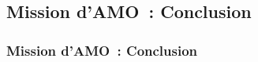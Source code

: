 \subsection{Mission d'AMO~: Conclusion}
\begin{frame}
	\frametitle{Mission d'AMO~: Conclusion}
\end{frame}

